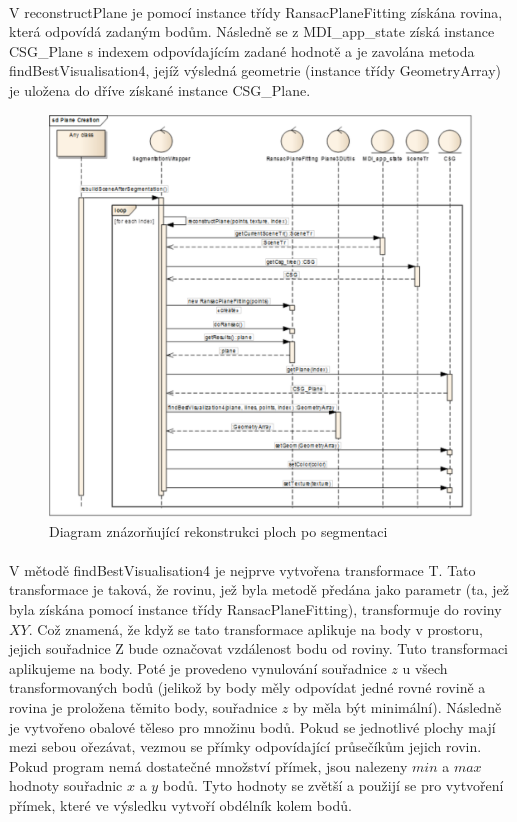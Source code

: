 \documentclass[11pt,twoside,a4paper]{book}
\begin{document}
\paragraph{}
V reconstructPlane je pomocí instance třídy RansacPlaneFitting získána rovina, která odpovídá zadaným bodům. Následně se z MDI\_app\_state získá instance CSG\_Plane s indexem odpovídajícím zadané hodnotě a je zavolána metoda findBestVisualisation4, jejíž výsledná geometrie (instance třídy GeometryArray) je uložena do dříve získané instance CSG\_Plane.

\begin{figure}[h]
	\begin{center}
		\includegraphics[width=15cm]{ilustrace/PlaneCreation}
		\caption{Diagram znázorňující rekonstrukci ploch po segmentaci}
		\label{fig:stateBefore}
	\end{center}
\end{figure}

\paragraph{}
V mětodě findBestVisualisation4 je nejprve vytvořena transformace T. Tato transformace je taková, že rovinu, jež byla metodě předána jako parametr (ta, jež byla získána pomocí instance třídy RansacPlaneFitting), transformuje do roviny $XY$. Což znamená, že když se tato transformace aplikuje na body v prostoru, jejich souřadnice Z bude označovat vzdálenost bodu od roviny. Tuto transformaci aplikujeme na body.  Poté je provedeno vynulování souřadnice $z$ u všech transformovaných bodů (jelikož by body měly odpovídat jedné rovné rovině a rovina je proložena těmito body, souřadnice $z$ by měla být minimální). Následně je vytvořeno obalové těleso pro množinu bodů. Pokud se jednotlivé plochy mají mezi sebou ořezávat, vezmou se přímky odpovídající průsečíkům jejich rovin. Pokud program nemá dostatečné množství přímek, jsou nalezeny $min$ a $max$ hodnoty souřadnic $x$ a $y$ bodů. Tyto hodnoty se zvětší a použijí se pro vytvoření přímek, které ve výsledku vytvoří obdélník kolem bodů. 
\end{document}
